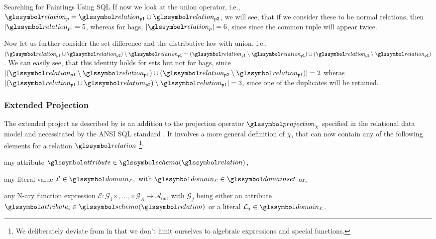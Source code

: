 \begin{example}[label=example:bag_vs_set]{Searching for Paintings Using SQL}{}
    If now we look at the union operator, i.e., $\relation_{p} = \relation_{\mathtt{p1}} \cup \relation_{\mathtt{p2}}$, we will see, that if we consider these to be normal relations, then $|\relation_{p}| = 5$, whereas for bags, $|\relation_{p}| = 6$, since since the common tuple will appear twice.

    Now let us further consider the set difference and the distributive law with union, i.e., $(\relation_{\mathtt{p1}} \cup \relation_{\mathtt{p2}}) \setminus \relation_{\mathtt{p1}} = (\relation_{\mathtt{p1}} \setminus \relation_{\mathtt{p1}}) \cup (\relation_{\mathtt{p2}} \setminus \relation_{\mathtt{p1}})$. We can easily see, that this identity holds for sets but not for bags, since $|(\relation_{\mathtt{p1}} \setminus \relation_{\mathtt{p1}}) \cup (\relation_{\mathtt{p2}} \setminus \relation_{\mathtt{p1}})| = 2$ wheras $|(\relation_{\mathtt{p1}} \cup \relation_{\mathtt{p2}}) \setminus \relation_{\mathtt{p1}}| = 3$, since one of the duplicates will be retained.
\end{example}

\subsubsection{Extended Projection}

The extended project as described by \cite{Garcia:2009Database} is an addition to the projection operator $\projection_{\chi}$ specified in the relational data model and necessitated by the ANSI SQL standard \cite[]{XOpen:1996SQL}. It involves a more general definition of $\chi$, that can now contain any of the following elements for a relation $\relation$ \footnote{We deliberately deviate from \cite{Garcia:2009Database} in that we don't limit ourselves to algebraic expressions and special functions.}:
\begin{enumerate*}[label=(\roman*)]
    \item any attribute $\attribute \in \schema(\relation)$,
    \item any literal value $\mathcal{L} \in \domain_{\mathcal{L}}, \text{ with } \domain_{\mathcal{L}} \in \domainset$ or,
    \item any N-ary function expression $\mathcal{E} \colon \mathcal{G}_1 \times, \ldots, \times \mathcal{G}_A \rightarrow \mathcal{A}_{\text{out}}$ with $\mathcal{G}_j$ being either an attribute $\attribute_i \in \schema(\relation)$ or a literal $\mathcal{L}_j \in \domain_{\mathcal{L}}$.
\end{enumerate*}

